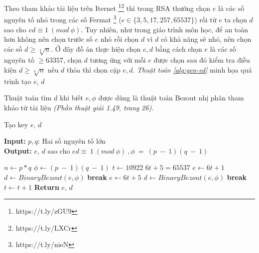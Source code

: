 Theo tham khảo tài liệu trên Iternet \footnote{https://t.ly/zGU9}\footnote{https://t.ly/LXCr} thì trong RSA thường chọn $e$ là các số nguyên tố nhỏ trong các số Fermat 
\footnote{https://t.ly/nieN} ($e \in \{3,5,17,257,65537\}$) 
rồi từ $e$ ta chọn $d$ sao cho $ed \equiv 1\ (mod\ \phi)$.
Tuy nhiên, như trong giáo trình môn học, để an toàn hơn không nên chọn trước số $e$ nhỏ rồi chọn $d$ vì $d$ có khả năng sẽ nhỏ, nên chọn các số $d \geq \sqrt[4]{n}$.
\cleardoublepage
Ở đây đồ án thực hiện chọn $e, d$ bằng cách chọn $e$ là các số nguyên tố $\geq 63357$, chọn $d$ tương ứng với mỗi $e$ được chọn sau đó kiểm tra điều kiện $d \geq \sqrt[4]{n}$ 
nếu $d$ thỏa thì chọn cặp $e, d$. \textit{Thuật toán \ref{alg:gen-ed}} minh họa quá trình tạo $e$, $d$

Thuật toán tìm $d$ khi biết $e, \phi$ được dùng là thuật toán Bezout nhị phân tham khảo từ tài liệu \cite{giaotrinh} \textit{(Phần thuật giải 1.49, trang 26)}.

\begin{algorithm}[H]
\caption{Tạo key $e$, $d$}\label{alg:gen-ed}
\hspace*{\algorithmicindent} \textbf{Input:} $p, q$: Hai số nguyên tố lớn\\
\hspace*{\algorithmicindent} \textbf{Output:} $e$, $d$ sao cho $ed \equiv \ 1\ (mod\ \phi)\ ,\phi\ =\ (p\ -\ 1)(q\ -\ 1)$ 
\begin{algorithmic}[1]
\State $n \gets p*q$
\State $\phi \gets (p\ -\ 1)(q\ -\ 1)$
\State $t \gets 10922$ \Comment $6t + 5 = 65537$
\State $e \gets 6t + 1$
\State $d \gets BinaryBezout(e, \phi)$
\State \textbf{break}
\EndIf
\EndIf
\State $e \gets 6t+5$
\State $d \gets BinaryBezout(e, \phi)$
\State \textbf{break}
\EndIf
\EndIf
\State $t \gets t + 1$
\EndWhile
\State \textbf{Return } $e$, $d$
\EndProcedure
\end{algorithmic}
\end{algorithm}